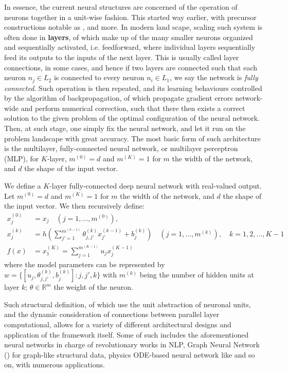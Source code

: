 In essence, the current neural structures are concerned of the operation of neurons together in a unit-wise fashion. This started way earlier, with precursor constructions notable as \cite{Rosenblatt1958ThePA,mcculloch_logical_1943}, and more. In modern land scape, scaling such system is often done in \textbf{layers}, of which make up of the many smaller neurons organized and sequentially activated, i.e. feedforward, where individual layers sequentially feed its outputs to the inputs of the next layer. This is usually called layer connections, in some cases, and hence if two layers are connected such that each neuron $n_{j}\in L_{2}$ is connected to every neuron $n_{i}\in L_{1}$, we say the network is \textit{fully connected}. Such operation is then repeated, and its learning behaviours controlled by the algorithm of backpropagation, of which propagate gradient errors network-wide and perform numerical correction, such that there then exists a correct solution to the given problem of the optimal configuration of the neural network. Then, at such stage, one simply fix the neural network, and let it run on the problem landscape with great accuracy. The most basic form of such architecture is the multilayer, fully-connected neural network, or multilayer perceptron (MLP), for $K$-layer, $m^{(0)}=d$ and $m^{(K)}=1$ for $m$ the width of the network, and $d$ the shape of the input vector.

\begin{definition}\label{def:SMLP}
    We define a $K$-layer fully-connected deep neural network with real-valued output. Let $m^{(0)}=d$ and $m^{(K)}=1$ for $m$ the width of the network, and $d$ the shape of the input vector. We then recursively define: 
\begin{align}
    x_{j}^{(0)} &= x_{j} \quad (j=1,\dots,m^{(0)}),\\ 
    x_{j}^{(k)} &= h\left(\sum^{m^{(k-1)}}_{j'=1} \theta_{j,j'}^{(k)}x_{j'}^{(k-1)}+ b_{j}^{(k)}\right)\quad (j=1,\dots,m^{(k)}), \quad k = 1,2,\dots,K-1\\
    f(x) & = x_{1}^{(K)} = \sum^{m^{(K-1)}}_{j=1} u_{j}x_{j}^{(K-1)}
\end{align}
where the model parameters can be represented by $w=\{[u_{j}, \theta_{j,j'}^{(k)}, b_{j}^{(k)}]: j,j',k\}$ with $m^{(k)}$ being the number of hidden units at layer $k$; $\theta\in \mathbb{R}^{m}$ the weight of the neuron.
\end{definition}

Such structural definition, of which use the unit abstraction of neuronal units, and the dynamic consideration of connections between parallel layer computational, allows for a variety of different architectural designs and application of the framework itself. Some of such includes the aforementioned neural networks in charge of revolutionary works in NLP, Graph Neural Network (\cite{Oono2020Graph,Scar04,GRP_Hamilton}) for graph-like structural data, physics ODE-based neural network like \cite{chen2019neuralordinarydifferentialequations} and so on, with numerous applications. 

